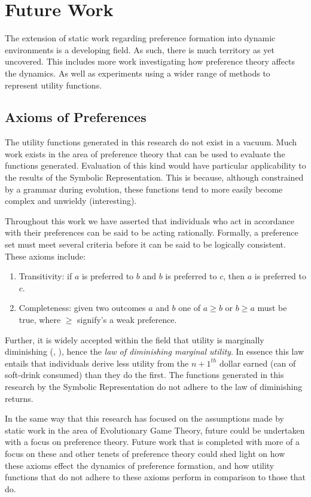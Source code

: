\documentclass[11pt]{book}
\newcommand*{\np}{\par\noindent\newline}
\begin{document}
\section{Future Work}

The extension of static work regarding preference formation into dynamic environments is a developing field.
As such, there is much territory as yet uncovered.
This includes more work investigating how preference theory affects the dynamics.
As well as experiments using a wider range of methods to represent utility functions.


\subsection{Axioms of Preferences}
The utility functions generated in this research do not exist in a vacuum.
Much work exists in the area of preference theory that can be used to evaluate the functions generated.
Evaluation of this kind would have particular applicability to the results of the Symbolic Representation.
This is because, although constrained by a grammar during evolution, these functions tend to more easily become complex and unwieldy (interesting).

\np Throughout this work we have asserted that individuals who act in accordance with their preferences can be said to be acting rationally.
Formally, a preference set must meet several criteria before it can be said to be logically consistent.
These axioms include:
\begin{enumerate}[label={\alph*)}]
	\item Transitivity: if $a$ is preferred to $b$ and $b$ is preferred to $c$, then $a$ is preferred to $c$.
	\item Completeness: given two outcomes $a$ and $b$ one of $a \geq b$ or $b \geq a$ must be true, where $\geq$ signify's a weak preference.
\end{enumerate}
\citet{angner_course_2012}

\np Further, it is widely accepted within the field that utility is marginally diminishing (\citet{angner_course_2012}, \citet{lane_diminishing_2000}), hence the \textit{law of diminishing marginal utility}.
In essence this law entails that individuals derive less utility from the $n+1^{th}$ dollar earned (can of soft-drink consumed) than they do the first.
The functions generated in this research by the Symbolic Representation do not adhere to the law of diminishing returns.

\np In the same way that this research has focused on the assumptions made by static work in the area of Evolutionary Game Theory, future could be undertaken with a focus on preference theory.
Future work that is completed with more of a focus on these and other tenets of preference theory could shed light on how these axioms effect the dynamics of preference formation, 
and how utility functions that do not adhere to these axioms perform in comparison to those that do.
\end{document}
